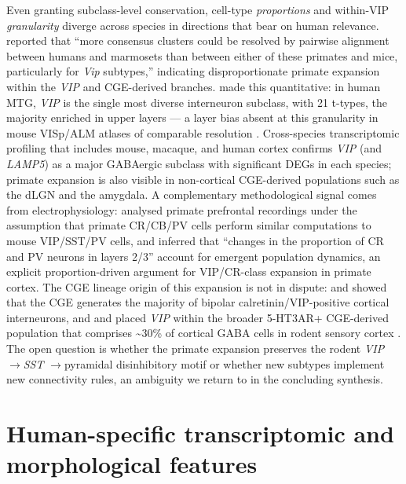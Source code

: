 \documentclass[11pt]{article}
\let\origrightarrow\rightarrow
\def\rightarrow{\ensuremath{\origrightarrow}}
\begin{document}
Even granting subclass-level conservation, cell-type \textit{proportions} and
within-VIP \textit{granularity} diverge across species in directions that bear on
human relevance. \citet{Bakken2021a} reported that ``more consensus
clusters could be resolved by pairwise alignment between humans and
marmosets than between either of these primates and mice, particularly for
\textit{Vip} subtypes,'' indicating disproportionate primate expansion within the
\textit{VIP} and CGE-derived branches. \citet{Hodge2019} made this quantitative:
in human MTG, \textit{VIP} is the single most diverse interneuron subclass, with
21 t-types, the majority enriched in upper layers --- a layer bias absent at
this granularity in mouse VISp/ALM atlases of comparable resolution
\citep{Tasic2018, Yao2023}. Cross-species transcriptomic profiling that
includes mouse, macaque, and human cortex confirms \textit{VIP} (and \textit{LAMP5}) as a
major GABAergic subclass with significant DEGs in each species; primate expansion
is also visible in non-cortical CGE-derived populations such as the dLGN
\citep{Bakken2021b} and the amygdala. A complementary
methodological signal comes from electrophysiology: \citet{Torresgomez2020}
analysed primate prefrontal recordings under the assumption that primate
CR/CB/PV cells perform similar computations to mouse VIP/SST/PV cells, and
inferred that ``changes in the proportion of CR and PV neurons in layers
2/3'' account for emergent population dynamics, an explicit
proportion-driven argument for VIP/CR-class expansion in primate cortex.
The CGE lineage origin of this expansion is not in dispute:
\citet{Fishell2011} and \citet{Lodato2011} showed that the CGE
generates the majority of bipolar calretinin/VIP-positive cortical
interneurons, and \citet{Tremblay2016} and \citet{Rudy2011} placed
\textit{VIP} within the broader 5-HT3AR+ CGE-derived population that comprises
{\textasciitilde}30\% of cortical GABA cells in rodent sensory cortex
. The open question is whether the primate
expansion preserves the rodent \textit{VIP} \rightarrow \textit{SST} \rightarrow pyramidal disinhibitory
motif or whether new subtypes implement new connectivity rules, an
ambiguity we return to in the concluding synthesis.

\section{Human-specific transcriptomic and morphological features}
\end{document}
